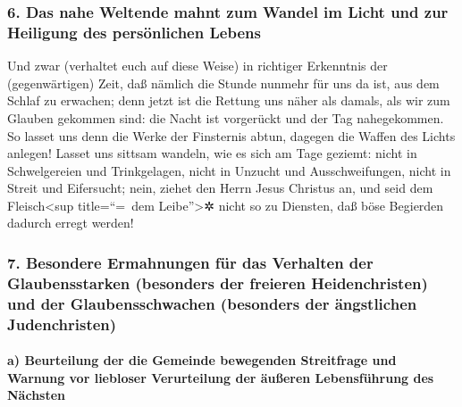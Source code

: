 \hypertarget{das-nahe-weltende-mahnt-zum-wandel-im-licht-und-zur-heiligung-des-persuxf6nlichen-lebens}{%
\subsubsection{6. Das nahe Weltende mahnt zum Wandel im Licht und zur
Heiligung des persönlichen
Lebens}\label{das-nahe-weltende-mahnt-zum-wandel-im-licht-und-zur-heiligung-des-persuxf6nlichen-lebens}}

 Und zwar (verhaltet euch auf diese Weise) in richtiger
Erkenntnis der (gegenwärtigen) Zeit, daß nämlich die Stunde nunmehr für
uns da ist, aus dem Schlaf zu erwachen; denn jetzt ist die Rettung uns
näher als damals, als wir zum Glauben gekommen sind:  die
Nacht ist vorgerückt und der Tag nahegekommen. So lasset uns denn die
Werke der Finsternis abtun, dagegen die Waffen des Lichts anlegen!
 Lasset uns sittsam wandeln, wie es sich am Tage geziemt:
nicht in Schwelgereien und Trinkgelagen, nicht in Unzucht und
Ausschweifungen, nicht in Streit und Eifersucht;  nein,
ziehet den Herrn Jesus Christus an, und seid dem Fleisch\textless sup
title=``=~dem Leibe''\textgreater✲ nicht so zu Diensten, daß böse
Begierden dadurch erregt werden!

\hypertarget{besondere-ermahnungen-fuxfcr-das-verhalten-der-glaubensstarken-besonders-der-freieren-heidenchristen-und-der-glaubensschwachen-besonders-der-uxe4ngstlichen-judenchristen}{%
\subsubsection{7. Besondere Ermahnungen für das Verhalten der
Glaubensstarken (besonders der freieren Heidenchristen) und der
Glaubensschwachen (besonders der ängstlichen
Judenchristen)}\label{besondere-ermahnungen-fuxfcr-das-verhalten-der-glaubensstarken-besonders-der-freieren-heidenchristen-und-der-glaubensschwachen-besonders-der-uxe4ngstlichen-judenchristen}}

\hypertarget{a-beurteilung-der-die-gemeinde-bewegenden-streitfrage-und-warnung-vor-liebloser-verurteilung-der-uxe4uuxdferen-lebensfuxfchrung-des-nuxe4chsten}{%
\paragraph{a) Beurteilung der die Gemeinde bewegenden Streitfrage und
Warnung vor liebloser Verurteilung der äußeren Lebensführung des
Nächsten}\label{a-beurteilung-der-die-gemeinde-bewegenden-streitfrage-und-warnung-vor-liebloser-verurteilung-der-uxe4uuxdferen-lebensfuxfchrung-des-nuxe4chsten}}

